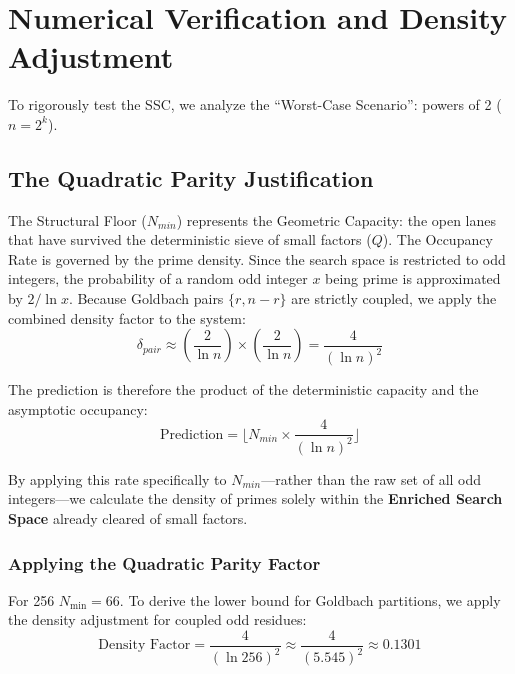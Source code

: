 \documentclass[sn-mathphys-num, pdflatex]{sn-jnl}
\begin{document}
\section{Numerical Verification and Density Adjustment}
\label{sec:verification}

To rigorously test the SSC, we analyze the ``Worst-Case Scenario'': powers of 2 ($n=2^k$).

\subsection{The Quadratic Parity Justification}
\label{subsec:quadratic_parity}

The Structural Floor ($N_{min}$) represents the Geometric Capacity: the open lanes that have survived the deterministic sieve of small factors ($Q$). The Occupancy Rate is governed by the prime density. Since the search space is restricted to odd integers, the probability of a random odd integer $x$ being prime is approximated by $2/\ln x$. Because Goldbach pairs $\{r, n-r\}$ are strictly coupled, we apply the combined density factor to the system:
\begin{equation}
\delta_{pair} \approx \left( \frac{2}{\ln n} \right) \times \left( \frac{2}{\ln n} \right) = \frac{4}{(\ln n)^2}
\end{equation}

The prediction is therefore the product of the deterministic capacity and the asymptotic occupancy:
\begin{equation}
\text{Prediction} = \lfloor N_{min} \times \frac{4}{(\ln n)^2} \rfloor
\end{equation}

By applying this rate specifically to $N_{min}$—rather than the raw set of all odd integers—we calculate the density of primes solely within the \textbf{Enriched Search Space} already cleared of small factors.

\subsubsection*{Applying the Quadratic Parity Factor}

For 256 $N_{\min} = 66$. To derive the lower bound for Goldbach partitions, we apply the density adjustment for coupled odd residues:
\begin{equation}
\text{Density Factor} = \frac{4}{(\ln 256)^2} \approx \frac{4}{(5.545)^2} \approx 0.1301
\end{equation}
\end{document}
